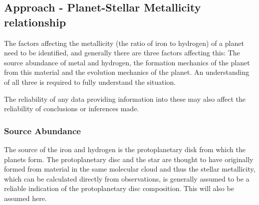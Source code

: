 \documentclass[a4paper,twocolumn,12pt]{article}
\begin{document}

\subsection{Approach - Planet-Stellar Metallicity relationship}
\label{subsection: Approach}

The factors affecting the metallicity (the ratio of iron to hydrogen) of a planet need to be identified, and generally there are three factors affecting this: The source abundance of metal and hydrogen, the formation mechanics of the planet from this material and the evolution mechanics of the planet. An understanding of all three is required to fully understand the situation.

The reliability of any data providing information into these may also affect the reliability of conclusions or inferences made.


\subsubsection{Source Abundance}
The source of the iron and hydrogen is the protoplanetary disk from which the planets form. %
The protoplanetary disc and the star are thought to have originally formed from material in the same molecular cloud and thus the stellar metallicity, which can be calculated directly from observations, is generally assumed to be a reliable indication of the protoplanetary disc composition. This will also be assumed here.
\end{document}
